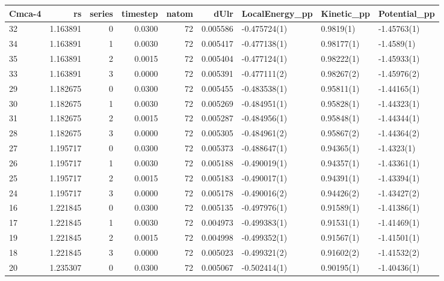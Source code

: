 \begin{tabular}{lrrrrrlll}
\toprule
Cmca-4 &        rs &  series &  timestep &  natom &      dUlr & LocalEnergy\_pp &  Kinetic\_pp & Potential\_pp \\
\midrule
32 &  1.163891 &       0 &    0.0300 &     72 &  0.005586 &   -0.475724(1) &   0.9819(1) &  -1.45763(1) \\
34 &  1.163891 &       1 &    0.0030 &     72 &  0.005417 &   -0.477138(1) &  0.98177(1) &   -1.4589(1) \\
35 &  1.163891 &       2 &    0.0015 &     72 &  0.005404 &   -0.477124(1) &  0.98222(1) &  -1.45933(1) \\
33 &  1.163891 &       3 &    0.0000 &     72 &  0.005391 &   -0.477111(2) &  0.98267(2) &  -1.45976(2) \\
29 &  1.182675 &       0 &    0.0300 &     72 &  0.005455 &   -0.483538(1) &  0.95811(1) &  -1.44165(1) \\
30 &  1.182675 &       1 &    0.0030 &     72 &  0.005269 &   -0.484951(1) &  0.95828(1) &  -1.44323(1) \\
31 &  1.182675 &       2 &    0.0015 &     72 &  0.005287 &   -0.484956(1) &  0.95848(1) &  -1.44344(1) \\
28 &  1.182675 &       3 &    0.0000 &     72 &  0.005305 &   -0.484961(2) &  0.95867(2) &  -1.44364(2) \\
27 &  1.195717 &       0 &    0.0300 &     72 &  0.005373 &   -0.488647(1) &  0.94365(1) &   -1.4323(1) \\
26 &  1.195717 &       1 &    0.0030 &     72 &  0.005188 &   -0.490019(1) &  0.94357(1) &  -1.43361(1) \\
25 &  1.195717 &       2 &    0.0015 &     72 &  0.005183 &   -0.490017(1) &  0.94391(1) &  -1.43394(1) \\
24 &  1.195717 &       3 &    0.0000 &     72 &  0.005178 &   -0.490016(2) &  0.94426(2) &  -1.43427(2) \\
16 &  1.221845 &       0 &    0.0300 &     72 &  0.005135 &   -0.497976(1) &  0.91589(1) &  -1.41386(1) \\
17 &  1.221845 &       1 &    0.0030 &     72 &  0.004973 &   -0.499383(1) &  0.91531(1) &  -1.41469(1) \\
19 &  1.221845 &       2 &    0.0015 &     72 &  0.004998 &   -0.499352(1) &  0.91567(1) &  -1.41501(1) \\
18 &  1.221845 &       3 &    0.0000 &     72 &  0.005023 &   -0.499321(2) &  0.91602(2) &  -1.41532(2) \\
20 &  1.235307 &       0 &    0.0300 &     72 &  0.005067 &   -0.502414(1) &  0.90195(1) &  -1.40436(1) \\

\end{tabular}
